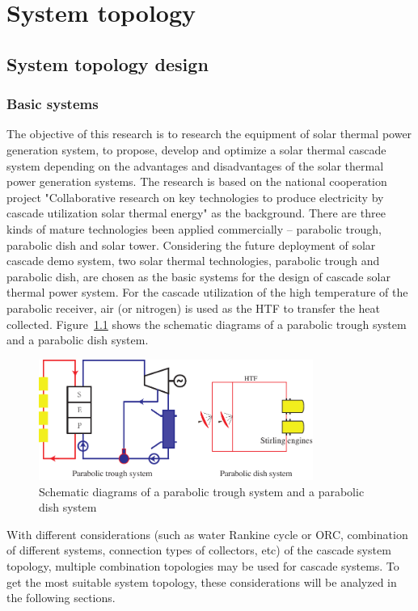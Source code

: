 \chapter{System topology}
\section{System topology design}
\subsection{Basic systems}
\label{sec:bs}

The objective of this research is to research the equipment of solar thermal power generation system, to propose, develop and optimize a solar thermal cascade system depending on the advantages and disadvantages of the solar thermal power generation systems. 
The research is based on the national cooperation project "Collaborative research on key technologies to produce electricity by cascade utilization solar thermal energy" as the background. 
There are three kinds of mature technologies been applied commercially -- parabolic trough, parabolic dish and solar tower. 
Considering the future deployment of solar cascade demo system, two solar thermal technologies, parabolic trough and parabolic dish, are chosen as the basic systems for the design of cascade solar thermal power system. For the cascade utilization of the high temperature of the parabolic receiver, air (or nitrogen) is used as the HTF to transfer the heat collected.
Figure~\ref{fig:PTPD} shows the schematic diagrams of a parabolic trough system and a parabolic dish system.

\begin{figure}[!ht]
\centering
\includegraphics[width=0.8\textwidth]{fig/PTPD.pdf}
\caption{Schematic diagrams of a parabolic trough system and a parabolic dish system}\label{fig:PTPD}
\end{figure}

With different considerations (such as water Rankine cycle or ORC, combination of different systems, connection types of collectors, etc) of the cascade system topology, multiple combination topologies may be used for cascade systems. To get the most suitable system topology, these considerations will be analyzed in the following sections. 

